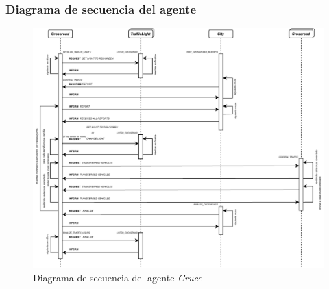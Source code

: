 \newpage
\subsubsection{Diagrama de secuencia del agente}
\begin{figure}[H]
    \centering
    \includegraphics[width=1\linewidth]{text/image/DAgen-DS-Crossroad.pdf}
    \caption{Diagrama de secuencia del agente \textit{Cruce}}
    \label{fig:ds_agente_cruce}
\end{figure}

\newpage
